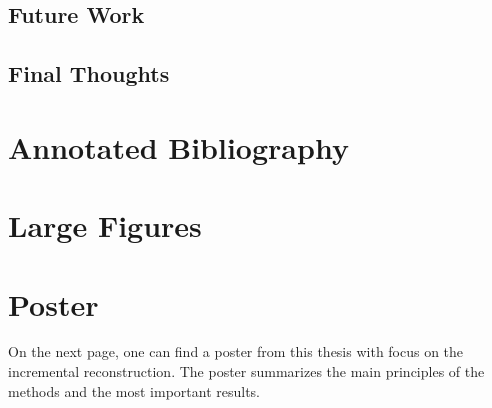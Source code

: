 \documentclass[12pt, twoside, a4paper]{book}
\begin{document}
	\section{Future Work}
		\label{section:future_work}
		
		
	\section{Final Thoughts}
		\label{section:final_thoughts}
		


\cleardoublepage
{}


\appendix

\chapter{Annotated Bibliography}
	\label{chapter:annotated_bib}
	
	

\cleardoublepage
\addtolength{\topmargin}{-1cm}
\addtolength{\textheight}{2cm}

\chapter{Large Figures}
	\label{chapter:large_figures}
	
	
	
\cleardoublepage
	
\addtolength{\topmargin}{1cm}
\addtolength{\textheight}{-2cm}

\chapter{Poster}
	\label{chapter:poster}
	
	On the next page, one can find a poster from this thesis with focus on the incremental reconstruction. The poster summarizes the main principles of the methods and the most important results.
	
\end{document}
